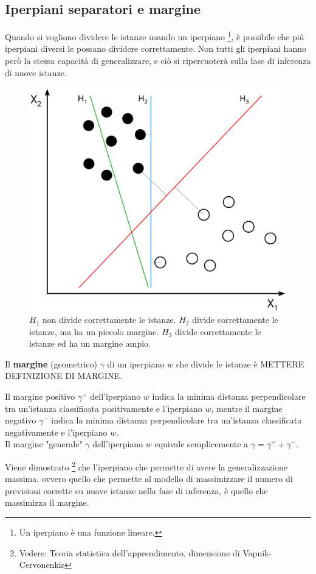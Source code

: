 \subsection{Iperpiani separatori e margine}
Quando si vogliono dividere le istanze usando un iperpiano
\footnote{Un iperpiano è una funzione lineare.}, è possibile che più iperpiani
diversi le possano dividere correttamente.
Non tutti gli iperpiani hanno però la stessa capacità di generalizzare, e ciò si
ripercuoterà sulla fase di inferenza di nuove istanze.
\begin{figure}[ht]
    \centering
    \includegraphics[width=0.5\linewidth]{img/hyperplanes.png}
    \caption{$H_1$ non divide correttamente le istanze. $H_2$ divide
    correttamente le istanze, ma ha un piccolo margine. $H_3$ divide
    correttamente le istanze ed ha un margine ampio.}
    \label{fig:svm_margin}
\end{figure}
\begin{defn}
    Il \textbf{margine} (geometrico) $\gamma$ di un iperpiano $w$ che divide le
    istanze è METTERE DEFINIZIONE DI MARGINE. 

    Il margine positivo $\gamma^+$ dell'iperpiano $w$ indica la minima distanza
    perpendicolare tra un'istanza classificata positivamente e l'iperpiano $w$,
    mentre il margine negativo $\gamma^-$ indica la minima distanza
    perpendicolare tra un'istanza classificata negativamente e
    l'iperpiano $w$.\\
    Il margine "generale" $\gamma$ dell'iperpiano $w$ equivale semplicemente a
    $\gamma = \gamma^+ + \gamma^-$.
\end{defn}
Viene dimostrato \footnote{Vedere: Teoria statistica dell'apprendimento,
dimensione di Vapnik-Cervonenkis} che l'iperpiano che permette di avere la
generalizzazione massima, ovvero quello che permette al modello di massimizzare
il numero di previsioni corrette su nuove istanze nella fase di inferenza, è
quello che massimizza il margine.

